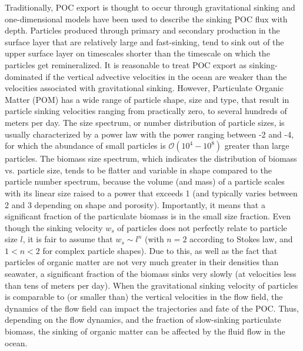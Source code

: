 \documentclass[article,linenumbers]{agujournal2018}
\begin{document}
	Traditionally, POC export is thought to occur through gravitational sinking and one-dimensional models have been used to describe the sinking POC flux with depth. Particles produced through primary and secondary production in the surface layer that are relatively large and fast-sinking, tend to sink out of the upper surface layer on timescales shorter than the timescale on which the particles get remineralized. It is reasonable to treat POC export as sinking-dominated if the vertical advective velocities in the ocean are weaker than the velocities associated with gravitational sinking. However, Particulate Organic Matter (POM) has a wide range of particle shape, size and type, that result in particle sinking velocities ranging from practically zero, to several hundreds of meters per day. The size spectrum, or number distribution of particle sizes, is usually characterized by a power law with the power ranging between -2 and -4, for which the abundance of small particles is $\mathcal{O}(10^4 - 10^8)$ greater than large particles. The biomass size spectrum, which indicates the distribution of biomass vs. particle size, tends to be flatter and variable in shape \citep{Sheldon_1972} compared to the particle number spectrum, because the volume (and mass) of a particle scales with its linear size raised to a power that exceeds 1 (and typically varies between 2 and 3 depending on shape and porosity).  Importantly, it means that a significant fraction of the particulate biomass is in the small size fraction. Even though the sinking velocity $w_s$ of particles does not perfectly relate to particle size $l$, it is fair to assume  that  $w_s \sim l^n$ (with $n=2$ according to Stokes law, and $1<n<2$ for complex particle shapes). Due to this, as well as the fact that particles of organic matter are not very much greater in their densities than seawater, a significant fraction of the biomass sinks very slowly (at velocities less than tens of meters per day).  When the gravitational sinking velocity of particles is comparable to (or smaller than) the vertical velocities in the flow field, the dynamics of the flow field can impact the trajectories and fate of the POC.  Thus, depending on the flow dynamics, and the fraction of slow-sinking particulate biomass, the sinking of organic matter can be affected by the fluid flow in the ocean.
	
\end{document}
